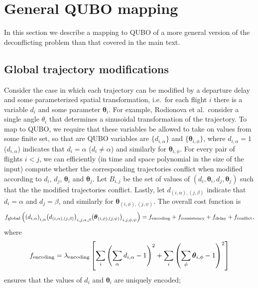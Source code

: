\section{General QUBO mapping}
In this section we describe a mapping to QUBO of a more general version of the deconflicting problem than that covered in the main text.

\subsection{Global trajectory modifications}
Consider the case in which each trajectory can be modified by a departure delay and some parameterized spatial transformation, i.e.\ for each flight $i$ there is a variable $d_i$ and some parameter $\boldsymbol \theta_i$.
For example, Rodionova et al.\ consider a single angle $\theta_i$ that determines a sinusoidal transformation of the trajectory.
To map to QUBO, we require that these variables be allowed to take on values from some finite set, so that are QUBO variables are $\{d_{i, \alpha}\}$ and $\{\boldsymbol \theta_{i,\phi}\}$, where $d_{i, \alpha} = 1$ ($d_{i, \alpha}$) indicates that $d_i = \alpha$ ($d_i \neq \alpha$) and similarly for $\boldsymbol \theta_{i, \phi}$.
For every pair of flights $i < j$, we can efficiently (in time and space polynomial in the size of the input) compute whether the corresponding trajectories conflict when modified according to $d_i$, $d_j$, $\boldsymbol \theta_i$ and $\boldsymbol \theta_j$.
Let $B_{i, j}$ be the set of values of $(d_i, \boldsymbol \theta_i, d_j, \boldsymbol \theta_j)$ such that the the modified trajectories conflict.
Lastly, let $d_{(i, \alpha), (j, \beta)}$ indicate that $d_i = \alpha$ and $ d_j = \beta$, and similarly for $\boldsymbol \theta_{(i, \phi), (j, \psi)}$.
The overall cost function is
\begin{equation}
f_{\mathrm{global}}
\left(
{\left(d_{i,\alpha}\right)}_{i,\alpha}
{\left(d_{(i,\alpha),(j,\beta)}\right)}_{i,j,\alpha,\beta}
{\left(\boldsymbol \theta_{(i,\phi),(j,\psi)}\right)}_{i,j,\phi,\psi}
\right)
=
f_{\mathrm{encoding}} +
f_{\mathrm{consistency}} +
f_{\mathrm{delay}} +
f_{\mathrm{conflict}},
\end{equation}
where 
\begin{equation}
  f_{\mathrm{encoding}}
  =
  \lambda_{\mathrm{encoding}}
  \left[
  \sum_{i} {\left(\sum_{\alpha} d_{i, \alpha} -1\right)}^2
  +
  \sum_{i} {\left(\sum_{\phi} \boldsymbol \theta_{i, \phi} -1\right)}^2
\right]
\end{equation}
ensures that the values of $d_i$ and $\boldsymbol \theta_i$ are uniquely encoded;
